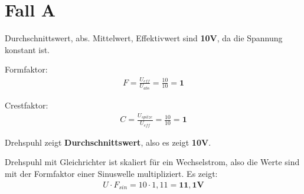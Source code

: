 \documentclass[fleqn,12pt]{article}
\begin{document}
\section{Fall A}
\begin{figure}[H]
\centering
{}
\end{figure}

Durchschnittswert, abs. Mittelwert, Effektivwert sind \textbf{10V}, da die Spannung konstant ist.

Formfaktor:
\begin{align*}
F = \frac{U_{eff}}{U_{abs}} = \frac{10}{10} = \mathbf{1}
\end{align*}

Crestfaktor:
\begin{align*}
C = \frac{U_{spitze}}{U_{eff}} = \frac{10}{10} = \mathbf{1}
\end{align*}

Drehspuhl zeigt \textbf{Durchschnittswert}, also es zeigt \textbf{10V}.

Drehspuhl mit Gleichrichter ist skaliert für ein Wechselstrom, also die Werte sind mit der Formfaktor einer Sinuswelle multipliziert. Es zeigt:
\begin{align*}
U \cdot F_{sin} = 10 \cdot 1,11 = \mathbf{11,1V}
\end{align*}
\end{document}
